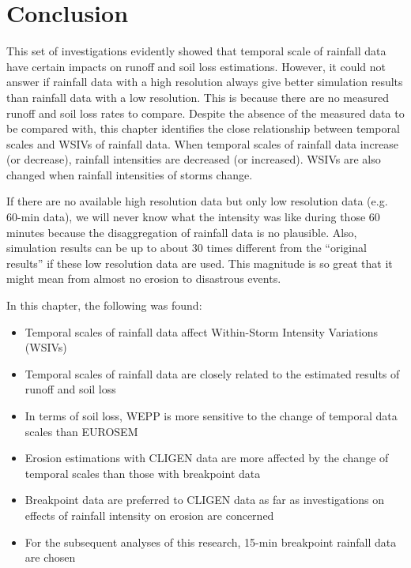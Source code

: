\section{Conclusion}
\label{sec:TemporalScalesConclusion}

This set of investigations evidently showed that temporal scale of rainfall data
have certain impacts on runoff and soil loss estimations. However, it could not
answer if rainfall data with a high resolution always give better simulation
results than rainfall data with a low resolution. This is because there are
no measured runoff and soil loss rates to compare. Despite the absence of the
measured data to be compared with, this chapter identifies the close
relationship between temporal scales and WSIVs of rainfall data. When temporal
scales of rainfall data increase (or decrease), rainfall intensities are
decreased (or increased). WSIVs are also changed when rainfall intensities of
storms change.

If there are no available high resolution data but only low resolution
data (e.g. 60-min data), we will never know what the intensity was like
during those 60 minutes because the disaggregation of rainfall data is no
plausible. Also, simulation results can be up to about 30 times different from
the ``original results'' if these low resolution data are used. This magnitude
is so great that it might mean from almost no erosion to disastrous events.

In this chapter, the following was found:
\begin{itemize}
  \item Temporal scales of rainfall data affect Within-Storm Intensity
Variations (WSIVs)
  \item Temporal scales of rainfall data are closely related to the estimated
results of runoff and soil loss
  \item In terms of soil loss, WEPP is more sensitive to the change of temporal
data scales than EUROSEM
  \item Erosion estimations with CLIGEN data are more affected by the change of
temporal scales than those with breakpoint data
  \item Breakpoint data are preferred to CLIGEN data as far as investigations
on effects of rainfall intensity on erosion are concerned
  \item For the subsequent analyses of this research, 15-min breakpoint rainfall
data are chosen
\end{itemize}


